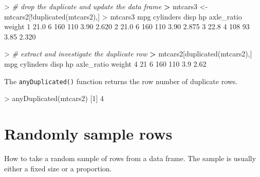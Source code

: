 \documentclass[
]{book}
\newenvironment{Shaded}{\begin{snugshade}}{\end{snugshade}}
\newcommand{\CommentTok}[1]{\textcolor[rgb]{0.56,0.35,0.01}{\textit{#1}}}
\newcommand{\DecValTok}[1]{\textcolor[rgb]{0.00,0.00,0.81}{#1}}
\newcommand{\ErrorTok}[1]{\textcolor[rgb]{0.64,0.00,0.00}{\textbf{#1}}}
\newcommand{\FloatTok}[1]{\textcolor[rgb]{0.00,0.00,0.81}{#1}}
\newcommand{\FunctionTok}[1]{\textcolor[rgb]{0.00,0.00,0.00}{#1}}
\newcommand{\NormalTok}[1]{#1}
\newcommand{\OtherTok}[1]{\textcolor[rgb]{0.56,0.35,0.01}{#1}}
\newcommand{\SpecialCharTok}[1]{\textcolor[rgb]{0.00,0.00,0.00}{#1}}
\begin{document}
\begin{Shaded}
\begin{Highlighting}[]
\SpecialCharTok{\textgreater{}} \CommentTok{\# drop the duplicate and update the data frame}
\ErrorTok{\textgreater{}}\NormalTok{ mtcars3 }\OtherTok{\textless{}{-}}\NormalTok{ mtcars2[}\SpecialCharTok{!}\FunctionTok{duplicated}\NormalTok{(mtcars2),]}
\SpecialCharTok{\textgreater{}}\NormalTok{ mtcars3}
\NormalTok{   mpg cylinders disp  hp axle\_ratio weight}
\DecValTok{1} \FloatTok{21.0}         \DecValTok{6}  \DecValTok{160} \DecValTok{110}       \FloatTok{3.90}  \FloatTok{2.620}
\DecValTok{2} \FloatTok{21.0}         \DecValTok{6}  \DecValTok{160} \DecValTok{110}       \FloatTok{3.90}  \FloatTok{2.875}
\DecValTok{3} \FloatTok{22.8}         \DecValTok{4}  \DecValTok{108}  \DecValTok{93}       \FloatTok{3.85}  \FloatTok{2.320}
\end{Highlighting}
\end{Shaded}

\begin{Shaded}
\begin{Highlighting}[]
\SpecialCharTok{\textgreater{}} \CommentTok{\# extract and investigate the duplicate row}
\ErrorTok{\textgreater{}}\NormalTok{ mtcars2[}\FunctionTok{duplicated}\NormalTok{(mtcars2),]}
\NormalTok{  mpg cylinders disp  hp axle\_ratio weight}
\DecValTok{4}  \DecValTok{21}         \DecValTok{6}  \DecValTok{160} \DecValTok{110}        \FloatTok{3.9}   \FloatTok{2.62}
\end{Highlighting}
\end{Shaded}

The \texttt{anyDuplicated()} function returns the row number of duplicate rows.

\begin{Shaded}
\begin{Highlighting}[]
\SpecialCharTok{\textgreater{}} \FunctionTok{anyDuplicated}\NormalTok{(mtcars2)}
\NormalTok{[}\DecValTok{1}\NormalTok{] }\DecValTok{4}
\end{Highlighting}
\end{Shaded}

\hypertarget{randomly-sample-rows}{%
\section{Randomly sample rows}\label{randomly-sample-rows}}

How to take a random sample of rows from a data frame. The sample is usually either a fixed size or a proportion.
\end{document}
